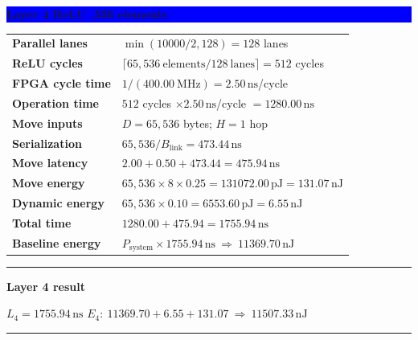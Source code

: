 \documentclass[10pt]{article}
\newcommand{\ns}{\,\mathrm{ns}}
\newcommand{\pj}{\,\mathrm{pJ}}
\newcommand{\nj}{\,\mathrm{nJ}}
\newenvironment{resultbox}[1]
  {\begin{center}\begin{minipage}{0.93\linewidth}\color{green}
   \hrule height 1pt\vspace{0.35em}\textbf{#1}\par\smallskip\color{black}}
  {\vspace{0.25em}\color{green}\hrule height 1pt\end{minipage}\end{center}}
\newcommand{\layerbar}[1]{\vspace{0.35em}\noindent
  \colorbox{blue}{\parbox{\dimexpr\linewidth-2\fboxsep\relax}{
  \color{white}\bfseries #1}}\par\vspace{0.2em}}
\begin{document}
\layerbar{Layer 4 \quad ReLU ,536 elements}
\begin{tabularx}{\linewidth}{@{}L Y@{}}
\textbf{Parallel lanes} & $\min(10000/2,128)=128$ lanes \\
\textbf{ReLU cycles} & $\lceil65{,}536\ \mathrm{elements}/128\ \mathrm{lanes}\rceil=512$ cycles \\
\textbf{FPGA cycle time} & $1/(400.00\ \mathrm{MHz})=2.50\ns$/cycle \\
\textbf{Operation time} & $512$ cycles $\times2.50\ns$/cycle $=1280.00\ns$ \\
\textbf{Move inputs} & $D=65{,}536$ bytes; $H=1$ hop \\
\textbf{Serialization} & $65{,}536/B_{\mathrm{link}}=473.44\ns$ \\
\textbf{Move latency} & $2.00+0.50+473.44=475.94\ns$ \\
\textbf{Move energy} & $65{,}536\times8\times0.25=131072.00\pj=131.07\nj$ \\
\textbf{Dynamic energy} & $65{,}536\times0.10=6553.60\pj=6.55\nj$ \\
\textbf{Total time} & $1280.00+475.94=1755.94\ns$ \\
\textbf{Baseline energy} & $P_{\mathrm{system}}\times1755.94\ns\ \Longrightarrow\ 11369.70\nj$ \\
\bottomrule
\end{tabularx}
\begin{resultbox}{Layer 4 result}
$L_4=1755.94\ns$ \hfill $E_4:\ 11369.70+6.55+131.07\ \Longrightarrow\ 11507.33\nj$
\end{resultbox}
\end{document}
